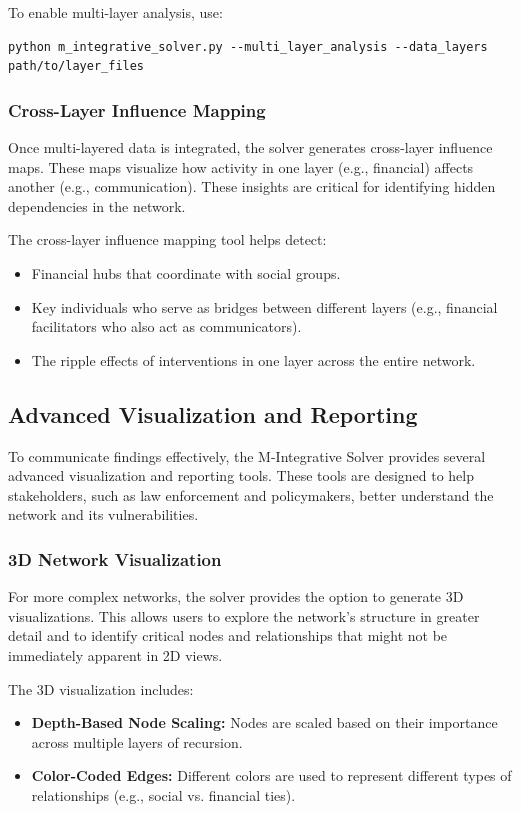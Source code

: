 \documentclass[%
 preprint, linenumbers,
 amsmath,amssymb,
 aps, physrev,
]{revtex4-2}
\begin{document}
To enable multi-layer analysis, use:
\begin{verbatim}
python m_integrative_solver.py --multi_layer_analysis --data_layers path/to/layer_files
\end{verbatim}

\subsubsection{Cross-Layer Influence Mapping}

Once multi-layered data is integrated, the solver generates cross-layer influence maps. These maps visualize how activity in one layer (e.g., financial) affects another (e.g., communication). These insights are critical for identifying hidden dependencies in the network.

The cross-layer influence mapping tool helps detect:
\begin{itemize}
    \item Financial hubs that coordinate with social groups.
    \item Key individuals who serve as bridges between different layers (e.g., financial facilitators who also act as communicators).
    \item The ripple effects of interventions in one layer across the entire network.
\end{itemize}

\subsection{Advanced Visualization and Reporting}

To communicate findings effectively, the M-Integrative Solver provides several advanced visualization and reporting tools. These tools are designed to help stakeholders, such as law enforcement and policymakers, better understand the network and its vulnerabilities.

\subsubsection{3D Network Visualization}

For more complex networks, the solver provides the option to generate 3D visualizations. This allows users to explore the network’s structure in greater detail and to identify critical nodes and relationships that might not be immediately apparent in 2D views.

The 3D visualization includes:
\begin{itemize}
    \item \textbf{Depth-Based Node Scaling:} Nodes are scaled based on their importance across multiple layers of recursion.
    \item \textbf{Color-Coded Edges:} Different colors are used to represent different types of relationships (e.g., social vs. financial ties).
\end{itemize}
\end{document}
